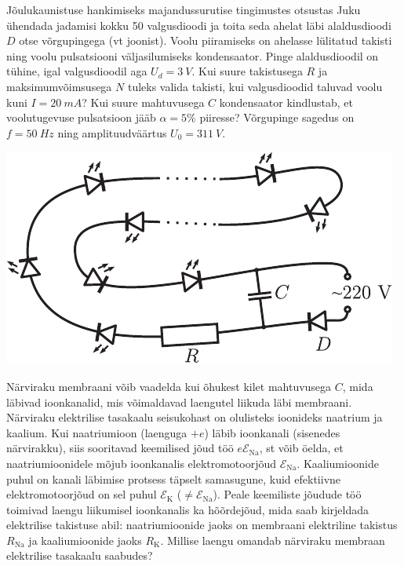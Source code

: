 \documentclass[10pt]{article}
\begin{document}
{%

Jõulukaunistuse hankimiseks majandussurutise tingimustes otsustas Juku
ühendada jadamisi kokku 50 valgusdioodi ja toita seda ahelat läbi alaldusdioodi $D$ otse
võrgupingega (vt joonist). Voolu piiramiseks on ahelasse lülitatud takisti
ning voolu pulsatsiooni väljasilumiseks kondensaator. Pinge alaldusdioodil on
tühine, igal valgusdioodil aga $U_d=\SI{3}{V}$. Kui suure takistusega $R$ ja maksimumvõimsusega $N$ tuleks valida
takisti, kui valgusdioodid taluvad voolu kuni $I=\SI{20}{mA}$? Kui suure mahtuvusega $C$
kondensaator kindlustab, et voolutugevuse pulsatsioon jääb $\alpha=\num{5}\%$ piiresse? Võrgupinge
sagedus on $f=\SI{50}{Hz}$ ning amplituudväärtus $U_0=\SI{311}{V}$.

\begin{center}
	\includegraphics[scale=0.75]{2010-v3g-08-elektrikuunlad2}
\end{center}
\probend
\bigskip


Närviraku membraani võib vaadelda kui õhukest kilet mahtuvusega $C$, mida läbivad ioonkanalid, mis võimaldavad laengutel liikuda läbi
membraani. Närviraku elektrilise tasakaalu seisukohast on olulisteks ioonideks
naatrium ja kaalium. Kui naatriumioon (laenguga $+e$) läbib ioonkanali (sisenedes närvirakku), siis sooritavad keemilised jõud töö $e\mathcal{E}_{\mathrm{Na}}$, st võib öelda, et
naatriumioonidele mõjub ioonkanalis elektromotoorjõud $\mathcal{E}_{\mathrm{Na}}$. Kaaliumioonide
puhul on kanali läbimise protsess täpselt samasugune, kuid efektiivne elektromotoorjõud on sel puhul $\mathcal{E}_{\mathrm{K}}$ ($\neq \mathcal{E}_{\mathrm{Na}}$). Peale keemiliste jõudude töö toimivad
laengu liikumisel ioonkanalis ka hõõrdejõud, mida saab kirjeldada elektrilise
takistuse abil: naatriumioonide jaoks on membraani elektriline takistus $R_{\mathrm{Na}}$ ja kaaliumioonide jaoks $R_{\mathrm{K}}$. Millise laengu omandab närviraku membraan
elektrilise tasakaalu saabudes?
\probend
\bigskip
\newpage\subsection{\protect{}}

}
\end{document}
